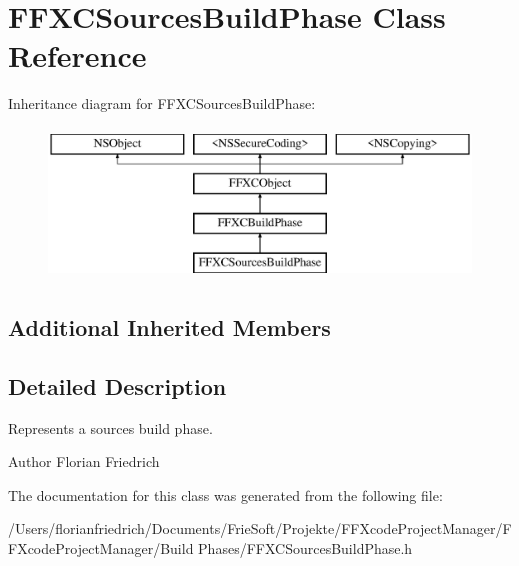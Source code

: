 \hypertarget{interface_f_f_x_c_sources_build_phase}{\section{F\-F\-X\-C\-Sources\-Build\-Phase Class Reference}
\label{interface_f_f_x_c_sources_build_phase}
}
Inheritance diagram for F\-F\-X\-C\-Sources\-Build\-Phase\-:\begin{figure}[H]
\begin{center}
\leavevmode
\includegraphics[height=4.000000cm]{interface_f_f_x_c_sources_build_phase}
\end{center}
\end{figure}
\subsection*{Additional Inherited Members}


\subsection{Detailed Description}
Represents a sources build phase. \begin{DoxyAuthor}{Author}
Florian Friedrich 
\end{DoxyAuthor}


The documentation for this class was generated from the following file\-:\begin{DoxyCompactItemize}
\item 
/\-Users/florianfriedrich/\-Documents/\-Frie\-Soft/\-Projekte/\-F\-F\-Xcode\-Project\-Manager/\-F\-F\-Xcode\-Project\-Manager/\-Build Phases/F\-F\-X\-C\-Sources\-Build\-Phase.\-h\end{DoxyCompactItemize}
